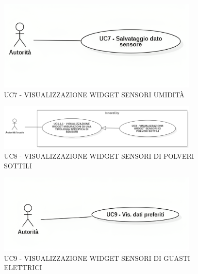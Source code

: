 \begin{figure}[H]
    \centering
    \includegraphics[width=0.9\textwidth]{../Images/uc7.png}
    \caption{UC7 - VISUALIZZAZIONE WIDGET SENSORI UMIDITÀ}
\end{figure}


\begin{figure}[H]
    \centering
    \includegraphics[width=0.9\textwidth]{../Images/uc8.PNG}
    \caption{UC8 - VISUALIZZAZIONE WIDGET SENSORI DI POLVERI SOTTILI}
\end{figure}


\begin{figure}[H]
    \centering
    \includegraphics[width=0.9\textwidth]{../Images/uc9.png}
    \caption{UC9 - VISUALIZZAZIONE WIDGET SENSORI DI GUASTI ELETTRICI}
\end{figure}

